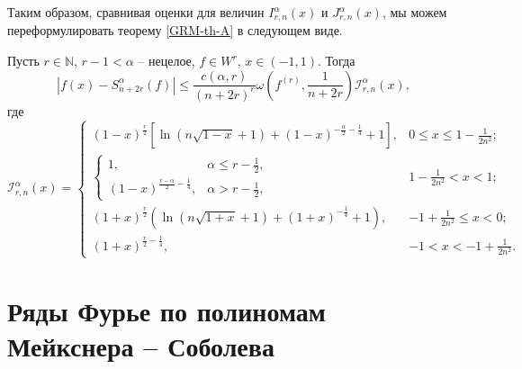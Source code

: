 Таким образом, сравнивая оценки для величин $I_{r,n}^\alpha(x)$ и $J_{r,n}^\alpha(x)$, мы можем переформулировать теорему \ref{GRM-th-A} в следующем виде.
\begin{theorem}\label{Ram-theo3}
Пусть $r\in\mathbb{N}$, $r-1<\alpha$ -- нецелое, $f\in W^r$, $x\in(-1,1)$. Тогда
\begin{equation*}
|f(x)-S^\alpha_{n+2r}(f)|\le \frac{c(\alpha,r)}{(n+2r)^r}\omega\left(f^{(r)},\frac{1}{n+2r}\right)\mathcal{I}_{r,n}^\alpha(x),
\end{equation*}
где
$$
\mathcal{I}_{r,n}^\alpha(x)=
\begin{cases}
     (1-x)^{\frac{r}{2}}\left[\ln(n\sqrt{1-x}+1)+(1-x)^{-\frac{\alpha}{2}-\frac14}+1\right], & 0\le x\le 1-\frac{1}{2n^2}; \\
     \begin{cases}
	       1, & \alpha\le r-\frac12, \\
	       (1-x)^{\frac{r-\alpha}{2}-\frac14}, & \alpha>r-\frac12,
     \end{cases} & 1-\frac{1}{2n^2}<x<1;\\
    (1+x)^{\frac{r}{2}}\left(\ln(n\sqrt{1+x}+1)+(1+x)^{-\frac14}+1\right), & -1+\frac{1}{2n^2}\le x<0; \\
    (1+x)^{\frac{r}{2}-\frac14}, & -1<x<-1+\frac{1}{2n^2}.
\end{cases}
$$
\end{theorem}


\chapter{Ряды Фурье по полиномам Мейкснера -- Соболева}\label{Ram-Mex}
